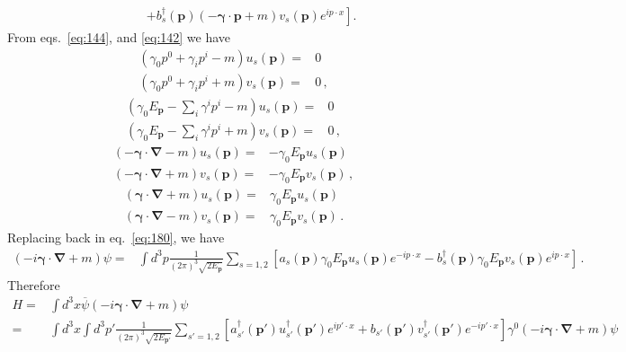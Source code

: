 \begin{frame}
\begin{align}
&\qquad\left.+b_s^\dagger(\mathbf{p})\left(-\boldsymbol{\gamma}\cdot\mathbf{p}+m\right)v_s(\mathbf{p})e^{i p\cdot x}\right].  
\end{align}
From eqs.~\eqref{eq:144}, and \eqref{eq:142} we have
\begin{align}
  \left(\gamma_0 p^0+\gamma_i p^i-m\right)u_s(\mathbf{p})=&0\nonumber\\
  \left(\gamma_0 p^0+\gamma_i p^i+m\right)v_s(\mathbf{p})=&0\,,
\end{align}
\begin{align}
  \left(\gamma_0 E_{\mathbf{p}}-\sum_i\gamma^i p^i-m\right)u_s(\mathbf{p})=&0\nonumber\\
  \left(\gamma_0 E_{\mathbf{p}}-\sum_i\gamma^i p^i+m\right)v_s(\mathbf{p})=&0\,,
\end{align}
\begin{align}
  \left(-\boldsymbol{\gamma}\cdot\boldsymbol{\nabla}-m\right)u_s(\mathbf{p})=&-\gamma_0 E_{\mathbf{p}}u_s(\mathbf{p})\nonumber\\
  \left(-\boldsymbol{\gamma}\cdot\boldsymbol{\nabla}+m\right)v_s(\mathbf{p})=&-\gamma_0 E_{\mathbf{p}}v_s(\mathbf{p})\,,
\end{align}
\begin{align}
  \left(\boldsymbol{\gamma}\cdot\boldsymbol{\nabla}+m\right)u_s(\mathbf{p})=&\gamma_0 E_{\mathbf{p}}u_s(\mathbf{p})\nonumber\\
  \left(\boldsymbol{\gamma}\cdot\boldsymbol{\nabla}-m\right)v_s(\mathbf{p})=&\gamma_0 E_{\mathbf{p}}v_s(\mathbf{p})\,.
\end{align}
Replacing back in eq.~\eqref{eq:180}, we have
\begin{align}
 \left(-i\boldsymbol{\gamma}\cdot\boldsymbol{\nabla}+m\right)\psi=&\int d^3p\frac{1}{(2\pi)^3\sqrt{2 E_{\mathbf{p}}}}\sum_{s=1,2}\left[a_s(\mathbf{p})\gamma_0 E_{\mathbf{p}}u_s(\mathbf{p})e^{-i p\cdot x}
-b_s^\dagger(\mathbf{p})\gamma_0 E_{\mathbf{p}}v_s(\mathbf{p})e^{i p\cdot x}\right]\,.
\end{align}
Therefore
\begin{align}
  H=&\int d^3x\overline{\psi}\left(-i\boldsymbol{\gamma}\cdot\boldsymbol{\nabla}+m\right)\psi\nonumber\\
=&\int d^3x\int d^3p'\frac{1}{(2\pi)^3\sqrt{2 E_{\mathbf{p}'}}}\sum_{s'=1,2}\left[a_{s'}^\dagger(\mathbf{p}')u^\dagger_{s'}(\mathbf{p}')e^{i p'\cdot x}
+b_{s'}(\mathbf{p}')v^\dagger_{s'}(\mathbf{p}')e^{-i p'\cdot x}\right]\gamma^0
\left(-i\boldsymbol{\gamma}\cdot\boldsymbol{\nabla}+m\right)\psi\nonumber\\

\end{align}
\end{frame}
